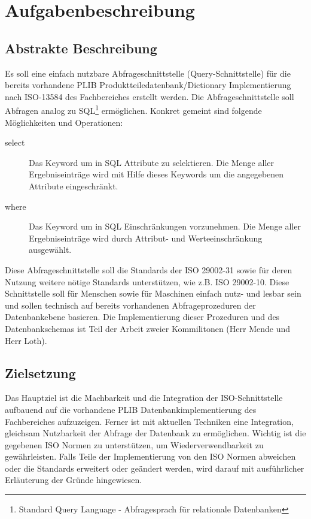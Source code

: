 \chapter{Aufgabenbeschreibung} \label{Aufgabenbeschreibung}

\section{Abstrakte Beschreibung}

Es soll eine einfach nutzbare Abfrageschnittstelle (Query-Schnittstelle) für die bereits vorhandene PLIB Produktteiledatenbank/Dictionary Implementierung nach ISO-13584 des Fachbereiches erstellt werden. Die Abfrageschnittstelle soll Abfragen analog zu SQL\footnote{Standard Query Language - Abfragesprach für relationale Datenbanken} ermöglichen. 
Konkret gemeint sind folgende Möglichkeiten und Operationen:
\begin{description}
\item[select] Das Keyword um in SQL Attribute zu selektieren. Die Menge aller Ergebniseinträge wird mit Hilfe dieses Keywords um die angegebenen Attribute eingeschränkt.  
\item[where] Das Keyword um in SQL Einschränkungen vorzunehmen. Die Menge aller Ergebniseinträge wird durch Attribut- und Werteeinschränkung ausgewählt.  
\end{description}
 
Diese Abfrageschnittstelle soll die Standards der ISO 29002-31 sowie für deren Nutzung weitere nötige Standards unterstützen, wie z.B. ISO 29002-10. Diese Schnittstelle soll für Menschen sowie für Maschinen einfach nutz- und lesbar sein und sollen technisch auf bereits vorhandenen Abfrageprozeduren der Datenbankebene basieren. Die Implementierung dieser Prozeduren und des Datenbankschemas ist Teil der Arbeit zweier Kommilitonen (Herr Mende und Herr Loth).

\section{Zielsetzung}

Das Hauptziel ist die Machbarkeit und die Integration der ISO-Schnittstelle aufbauend auf die vorhandene PLIB Datenbankimplementierung des Fachbereiches aufzuzeigen. 
Ferner ist mit aktuellen Techniken eine Integration, gleichsam Nutzbarkeit der Abfrage der Datenbank zu ermöglichen. Wichtig ist die gegebenen ISO Normen zu unterstützen, um Wiederverwendbarkeit zu gewährleisten. Falls Teile der Implementierung von den ISO Normen abweichen oder die Standards erweitert oder geändert werden, wird darauf mit ausführlicher Erläuterung der Gründe hingewiesen. 

